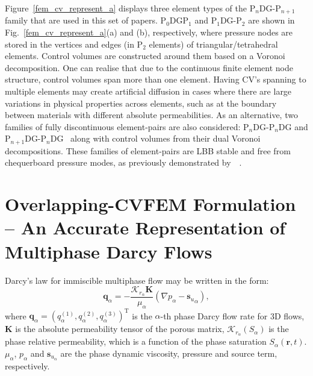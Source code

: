 \documentclass[preprint,authoryear,12pt]{elsarticle}
\newcommand{\JGnote}[1]{\fbox{\parbox{\textwidth}{ \color{blue} JG: #1}}}
\newcommand{\PNDG}[2][error]{P$_{#1}$DG-P$_{#2}$DG}
\begin{document}
Figure~\ref{fem_cv_represent_a} displays three element types of the P$_{n}$DG-P$_{n+1}$ family that are used in this set of papers. P$_{\text{0}}$DGP$_{\text{1}}$ and P$_{1}$DG-P$_{2}$ are shown in Fig.~\ref{fem_cv_represent_a}(a) and (b), respectively, where pressure nodes are stored in the vertices and edges (in P$_{\text{2}}$ elements) of triangular/tetrahedral elements. Control volumes are constructed around them based on a Voronoi decomposition.  One can realise that due to the continuous finite element node structure, control volumes span more than one element. Having CV's spanning to multiple elements may create artificial diffusion in cases where there are large variations in physical properties across elements, such as at the boundary between materials with different absolute permeabilities. As an alternative, two families of fully discontinuous element-pairs are also considered: \PNDG[n]{n} and \PNDG[n+1]{n}~\citep[Fig.~\ref{fem_cv_represent_a}(c), applications using these element-pairs are exploited in][]{pavlidis_2015} along with control volumes from their dual Voronoi decompositions. These families of element-pairs are LBB stable and free from chequerboard pressure modes, as previously demonstrated by~\citet{cotter_2009b}~\citep[see also][]{cotter_2011}.


\section{Overlapping-CVFEM Formulation -- An Accurate Representation of Multiphase Darcy Flows}
\label{overlapping_method_section}
Darcy's law for immiscible multiphase flow may be written \citep{chen_2006} in the form:%
\begin{equation}\label{e:darcy_eqn}
  \mathbf{q}_{\alpha} = -\frac{\mathcal{K}_{{r}_\alpha}\mathbf{K}}{\mu_{\alpha}}\left( \nabla p_{\alpha} - {\mathbf{s}_{u}}_{\alpha} \right),
\end{equation}
where $\mathbf{q}_{\alpha}=\left(q_\alpha^{(1)},q_\alpha^{(2)},q_\alpha^{(3)}\right)^{\text{T}}$ is the $\alpha$-th phase Darcy flow rate for 3D flows, $\mathbf{K}$ is the absolute permeability tensor of the porous matrix, $\mathcal{K}_{{r}_\alpha}\left(S_{\alpha}\right)$ is the phase relative permeability, which is a function of the phase saturation $S_{\alpha}\left(\mathbf{r},t\right)$. $\mu_{\alpha}$, $p_{\alpha}$ and $\mathbf{s}_{{u}_\alpha}$ are the phase dynamic viscosity, pressure and source term, respectively.
\end{document}
